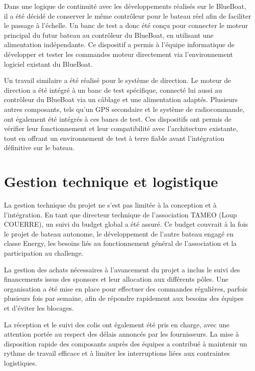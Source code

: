 \documentclass[11pt,letterpaper]{article}
\begin{document}
Dans une logique de continuité avec les développements réalisés sur le BlueBoat, il a été décidé de conserver le même contrôleur pour le bateau réel afin de faciliter le passage à l'échelle. Un banc de test a donc été conçu pour connecter le moteur principal du futur bateau au contrôleur du BlueBoat, en utilisant une alimentation indépendante. Ce dispositif a permis à l'équipe informatique de développer et tester les commandes moteur directement via l'environnement logiciel existant du BlueBoat.

Un travail similaire a été réalisé pour le système de direction. Le moteur de direction a été intégré à un banc de test spécifique, connecté lui aussi au contrôleur du BlueBoat via un câblage et une alimentation adaptés. Plusieurs autres composants, tels qu'un GPS secondaire et le système de radiocommande, ont également été intégrés à ces bancs de test. Ces dispositifs ont permis de vérifier leur fonctionnement et leur compatibilité avec l'architecture existante, tout en offrant un environnement de test à terre fiable avant l'intégration définitive sur le bateau.

\section{Gestion technique et logistique}

La gestion technique du projet ne s'est pas limitée à la conception et à l'intégration. En tant que directeur technique de l'association TAMEO (Loup COUERRE), un suivi du budget global a été assuré. Ce budget couvrait à la fois le projet de bateau autonome, le développement de l'autre bateau engagé en classe Energy, les besoins liés au fonctionnement général de l'association et la participation au challenge.

La gestion des achats nécessaires à l'avancement du projet a inclus le suivi des financements issus des sponsors et leur allocation aux différents pôles. Une organisation a été mise en place pour effectuer des commandes régulières, parfois plusieurs fois par semaine, afin de répondre rapidement aux besoins des équipes et d'éviter les blocages.

La réception et le suivi des colis ont également été pris en charge, avec une attention portée au respect des délais annoncés par les fournisseurs. La mise à disposition rapide des composants auprès des équipes a contribué à maintenir un rythme de travail efficace et à limiter les interruptions liées aux contraintes logistiques.
\end{document}
